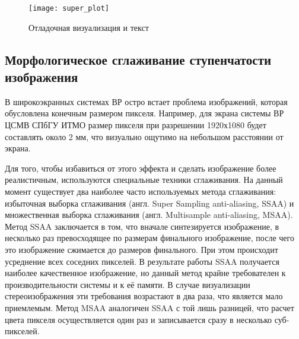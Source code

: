 \begin{figure}[ht]
\begin{center}
\texttt{[image: super\_plot]}
\end{center}
\caption{Отладочная визуализация и текст}
\label{super_plot}
\end{figure}

%

\subsection{Морфологическое сглаживание ступенчатости изображения}
В широкоэкранных системах ВР остро встает проблема  изображений, которая обусловлена конечным размером пикселя. Например, для экрана системы ВР ЦСМВ СПбГУ ИТМО размер пикселя при разрешении 1920х1080 будет составлять около 2 мм, что визуально ощутимо на небольшом расстоянии от экрана. 

Для того, чтобы избавиться от этого эффекта и сделать изображение более реалистичным, используются специальные техники сглаживания.
На данный момент существует два наиболее часто используемых метода сглаживания: избыточная выборка сглаживания (англ. Super Sampling anti-aliasing, SSAA) и множественная выборка сглаживания (англ. Multisample anti-aliasing, MSAA). Метод SSAA заключается в том, что вначале синтезируется изображение, в несколько раз превосходящее по размерам финального изображение, после чего это изображение сжимается до размеров финального. При этом происходит усреднение всех соседних пикселей. В результате работы SSAA получается наиболее качественное изображение, но данный метод крайне требователен к производительности системы и к её памяти. В случае визуализации стереоизображения эти требования возрастают в два раза, что является мало приемлемым. Метод MSAA аналогичен SSAA с той лишь разницей, что расчет цвета пикселя осуществляется один раз и записывается сразу в несколько суб-пикселей.

